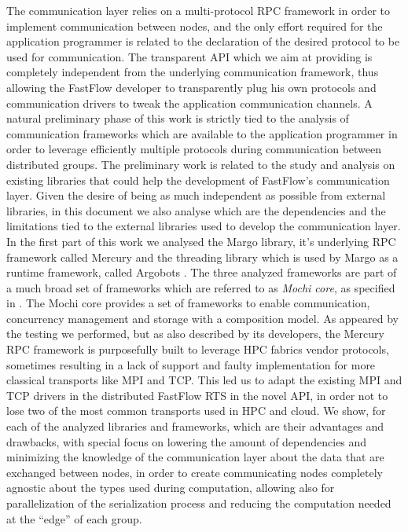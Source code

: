\documentclass[12pt, oneside]{report}
\begin{document}
The communication layer relies on a multi-protocol RPC framework in order to implement communication between nodes, and the only effort required for the application programmer is related to the declaration of the desired protocol to be used for communication. The transparent API which we aim at providing is completely independent from the underlying communication framework, thus allowing the FastFlow developer to transparently plug his own protocols and communication drivers to tweak the application communication channels. A natural preliminary phase of this work is strictly tied to the analysis of communication frameworks which are available to the application programmer in order to leverage efficiently multiple protocols during communication between distributed groups. The preliminary work is related to the study and analysis on existing libraries that could help the development of FastFlow's communication layer. Given the desire of being as much independent as possible from external libraries, in this document we also analyse which are the dependencies and the limitations tied to the external libraries used to develop the communication layer. In the first part of this work we analysed the Margo \cite{mochi-core} library, it's underlying RPC framework called Mercury \cite{mochi-core, mercury} and the threading library which is used by Margo as a runtime framework, called Argobots \cite{argobots-paper}. The three analyzed frameworks are part of a much broad set of frameworks which are referred to as \textit{Mochi core}, as specified in \cite{mochi-core}.  The Mochi core provides a set of frameworks to enable communication, concurrency management and storage with a composition model. As appeared by the testing we performed, but as also described by its developers, the Mercury RPC framework is purposefully built to leverage HPC fabrics vendor protocols, sometimes resulting in a lack of support and faulty implementation for more classical transports like MPI and TCP. This led us to adapt the existing MPI and TCP drivers in the distributed FastFlow RTS in the novel API, in order not to lose two of the most common transports used in HPC and cloud. We show, for each of the analyzed libraries and frameworks, which are their advantages and drawbacks, with special focus on lowering the amount of dependencies and minimizing the knowledge of the communication layer about the data that are exchanged between nodes, in order to create communicating nodes completely agnostic about the types used during computation, allowing also for parallelization of the serialization process and reducing the computation needed at the ``edge'' of each group.\newline
\end{document}
